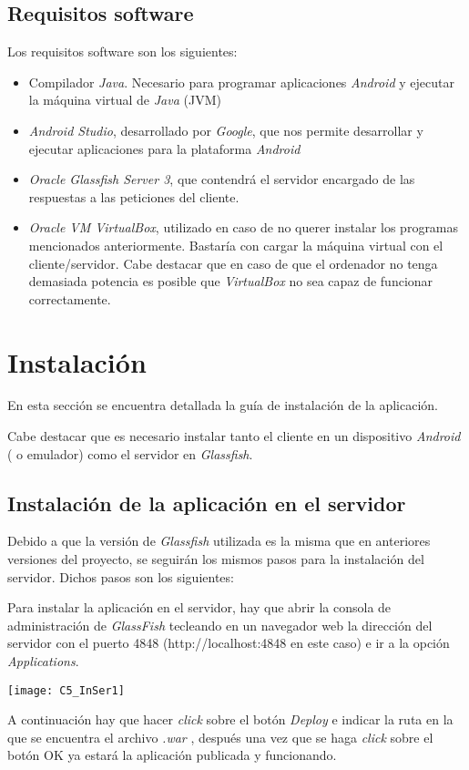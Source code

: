 \subsection{Requisitos software}
Los requisitos software son los siguientes:
\begin{itemize}
\item Compilador \textit{Java}. Necesario para programar aplicaciones \textit{Android} y ejecutar la máquina virtual de \textit{Java} (JVM)
\item \textit{Android Studio}, desarrollado por \textit{Google}, que nos permite desarrollar y ejecutar aplicaciones para la plataforma \textit{Android}
\item \textit{Oracle Glassfish Server 3}, que contendrá el servidor encargado de las respuestas a las peticiones del cliente.
\item \textit{Oracle VM VirtualBox}, utilizado en caso de no querer instalar los programas mencionados anteriormente. Bastaría con cargar la máquina virtual con el cliente/servidor. Cabe destacar que en caso de que el ordenador no tenga demasiada potencia es posible que \textit{VirtualBox} no sea capaz de funcionar correctamente.
\end{itemize}
\section{Instalación}
En esta sección se encuentra detallada la guía de instalación de la aplicación.

Cabe destacar que es necesario instalar tanto el cliente en un dispositivo \textit{Android} ( o emulador) como el servidor en \textit{Glassfish}.
\subsection{Instalación de la aplicación en el servidor}
Debido a que la versión de \textit{Glassfish} utilizada es la misma que en anteriores versiones del proyecto, se seguirán los mismos pasos para la instalación del servidor. Dichos pasos son los siguientes:

Para instalar la aplicación en el servidor, hay que abrir la consola de administración de \textit{GlassFish} tecleando en un navegador web la dirección del servidor con el puerto 4848 (http://localhost:4848 en este caso) e ir a la opción \textit{Applications}.

\texttt{[image: C5\_InSer1]}

A continuación hay que hacer \textit{click} sobre el botón \textit{Deploy} e indicar la ruta en la que se encuentra el archivo \textit{.war} , después una vez que se haga \textit{click} sobre el botón OK ya estará la aplicación publicada y funcionando.

